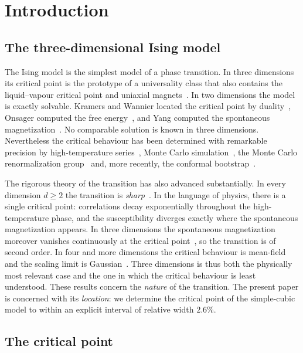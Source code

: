 \section{Introduction}\label{sec:intro}

\subsection{The three-dimensional Ising model}

The Ising model is the simplest model of a phase transition. In three dimensions its critical point is the prototype of a universality class that also contains the liquid--vapour critical point and uniaxial magnets~\cite{PV02}. In two dimensions the model is exactly solvable. Kramers and Wannier located the critical point by duality~\cite{KW41}, Onsager computed the free energy~\cite{Ons44}, and Yang computed the spontaneous magnetization~\cite{Yan52}. No comparable solution is known in three dimensions. Nevertheless the critical behaviour has been determined with remarkable precision by high-temperature series~\cite{PV02}, Monte Carlo simulation~\cite{FL91,FXL18}, the Monte Carlo renormalization group~\cite{RBS21} and, more recently, the conformal bootstrap~\cite{EPPRSV12,KPSV16}.

The rigorous theory of the transition has also advanced substantially. In every dimension $d\ge2$ the transition is \emph{sharp}~\cite{ABF87,DCT16}. In the language of physics, there is a single critical point: correlations decay exponentially throughout the high-temperature phase, and the susceptibility diverges exactly where the spontaneous magnetization appears. In three dimensions the spontaneous magnetization moreover vanishes continuously at the critical point~\cite{ADCS15}, so the transition is of second order. In four and more dimensions the critical behaviour is mean-field and the scaling limit is Gaussian~\cite{AD21}. Three dimensions is thus both the physically most relevant case and the one in which the critical behaviour is least understood. These results concern the \emph{nature} of the transition. The present paper is concerned with its \emph{location}: we determine the critical point of the simple-cubic model to within an explicit interval of relative width $2.6\%$.

\subsection{The critical point}

